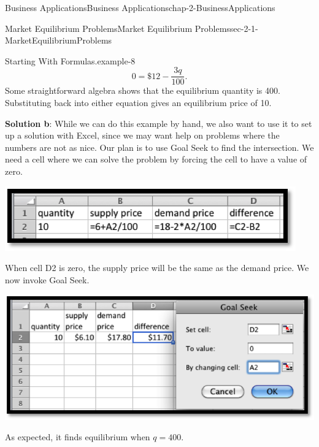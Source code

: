 \documentclass[oneside,10pt,]{book}
\newcommand{\terminology}[1]{\textbf{#1}}
\numberwithin{equation}{section}
\begin{document}
\begin{chapterptx}{Business Applications}{}{Business Applications}{}{}{chap-2-BusinessApplications}
\begin{sectionptx}{Market Equilibrium Problems}{}{Market Equilibrium Problems}{}{}{sec-2-1-MarketEquilibriumProblems}
\begin{example}{Starting With Formulas.}{example-8}
%
\begin{equation*}
0=\$12-\frac{3q}{100}.
\end{equation*}
\hypertarget{p-566}{}%
Some straightforward algebra shows that the equilibrium quantity is 400.  Substituting back into either equation gives an equilibrium price of \textdollar{}10.%
\par
\hypertarget{p-567}{}%
\terminology{Solution b}: While we can do this example by hand, we also want to use it to set up a solution with Excel, since we may want help on problems where the numbers are not as nice.  Our plan is to use Goal Seek to find the intersection.  We need a cell where we can solve the problem by forcing the cell to have a value of zero. \begin{sidebyside}{1}{0.25}{0.25}{0}%
\begin{sbspanel}{0.5}%
\includegraphics[width=1\linewidth]{images/sec2-1-2.png}
\end{sbspanel}%
\end{sidebyside}%
%
\par
\hypertarget{p-568}{}%
When cell D2 is zero, the supply price will be the same as the demand price.  We now invoke Goal Seek. \leavevmode%
\begin{sidebyside}{1}{0.2}{0.2}{0}%
\begin{sbspanel}{0.6}%
\includegraphics[width=1\linewidth]{images/sec2-1-3.png}
\end{sbspanel}%
\end{sidebyside}%
%
\par
\hypertarget{p-569}{}%
As expected, it finds equilibrium when \(q=400\).%
\end{example}
\hypertarget{p-570}{}%

\end{sectionptx}
\end{chapterptx}
\end{document}
